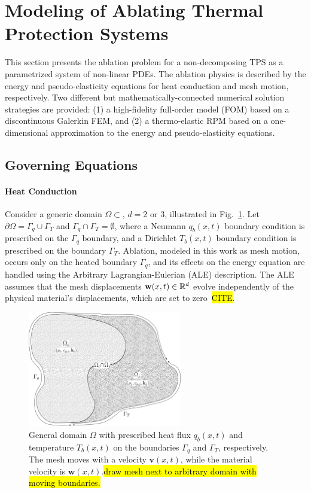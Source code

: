 \section{Modeling of Ablating Thermal Protection Systems}

This section presents the ablation problem for a non-decomposing TPS as a parametrized system of non-linear PDEs. The ablation physics is described by the energy and pseudo-elasticity equations for heat conduction and mesh motion, respectively. Two different but mathematically-connected numerical solution strategies are provided: (1) a high-fidelity full-order model (FOM) based on a discontinuous Galerkin FEM, and (2) a thermo-elastic RPM based on a one-dimensional approximation to the energy and pseudo-elasticity equations.

\subsection{Governing Equations}\label{sec_governing_equations}

\paragraph*{Heat Conduction} Consider a generic domain $\Omega\subset$, $d=2$ or $3$, illustrated in Fig.~\ref{fig_general_domain}. Let $\partial\Omega = \Gamma_q\cup\Gamma_T$ and $\Gamma_q\cap\Gamma_T = \emptyset$, where a Neumann $q_b(x,t)$ boundary condition is prescribed on the $\Gamma_q$ boundary, and a Dirichlet $T_b(x,t)$ boundary condition is prescribed on the boundary $\Gamma_T$. Ablation, modeled in this work as mesh motion, occurs only on the heated boundary $\Gamma_q$, and its effects on the energy equation are handled using the Arbitrary Lagrangian-Eulerian (ALE) description. The ALE assumes that the mesh displacements $\mathbf{w}(x,t)\in\mathbb{R}^d$ evolve independently of the physical material's displacements, which are set to zero~\hl{CITE}.

\begin{figure}
    \centering
    \includegraphics[width=0.6\textwidth]{./figs/general_domain.png}
    \caption{General domain $\Omega$ with prescribed heat flux $q_b(x,t)$ and temperature $T_b(x,t)$ on the boundaries $\Gamma_q$ and $\Gamma_T$, respectively. The mesh moves with a velocity $\mathbf{v}(x,t)$, while the material velocity is $\mathbf{w}(x,t)$.\hl{draw mesh next to arbitrary domain with moving boundaries.}}
    \label{fig_general_domain}
\end{figure}

